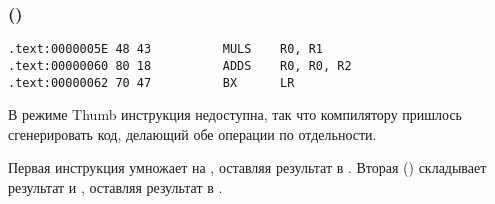 \subsubsection{\OptimizingKeilVI (\ThumbMode)}

\begin{lstlisting}[label=ARM_leaf_example2]
.text:0000005E 48 43          MULS    R0, R1
.text:00000060 80 18          ADDS    R0, R0, R2
.text:00000062 70 47          BX      LR
\end{lstlisting}

В режиме Thumb инструкция  недоступна, так что компилятору пришлось сгенерировать код, 
делающий обе операции по отдельности.

Первая инструкция  умножает  на , оставляя результат в .
Вторая () складывает результат и , оставляя результат в .

